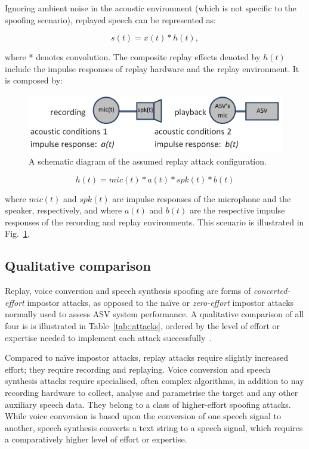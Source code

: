 Ignoring ambient noise in the acoustic environment (which is not specific to the spoofing scenario), replayed speech can be represented as:


\begin{equation}
s(t) = x(t)*h(t),
\label{eq:replay}
\end{equation}


\noindent where * denotes convolution.  The composite replay effects denoted by $h(t)$ include the impulse responses of replay hardware and the replay environment.  It is composed by:


\begin{figure}
	\includegraphics[width=1\linewidth]{Figs/replay.png}
	\caption{A schematic diagram of the assumed replay attack configuration. %
}
	\label{fig::Replay}
\end{figure}

\begin{equation}
h(t) = mic(t) * a(t) * spk(t) * b(t)
\label{eq::playback}
\end{equation}


\noindent where $mic(t)$ and $spk(t)$ are impulse responses of the microphone and the speaker, respectively, and where $a(t)$ and $b(t)$ are the respective impulse responses of the recording and replay environments.  This scenario is illustrated in Fig.~\ref{fig::Replay}.



\subsection{Qualitative comparison}
\label{sec::algorithms::comparison}

Replay, voice conversion and speech synthesis spoofing are forms of \emph{concerted-effort} impostor attacks, as opposed to the na\"{i}ve or \emph{zero-effort} impostor attacks normally used to assess ASV system performance.  A qualitative comparison of all four is is illustrated in Table~\ref{tab::attacks}, ordered by the level of effort or expertise needed to implement each attack successfully~\cite{Wu2014a}. 

Compared to na\"{i}ve impostor attacks, replay attacks require slightly increased effort; they require recording and replaying. Voice conversion and speech synthesis attacks require specialised, often complex algorithms, in addition to nay recording hardware to collect, analyse and parametrise the target and any other auxiliary speech data.  They belong to a class of higher-effort spoofing attacks.  While voice conversion is based upon the conversion of one speech signal to another, speech synthesis converts a text string to a speech signal, which requires a comparatively higher level of effort or expertise.

